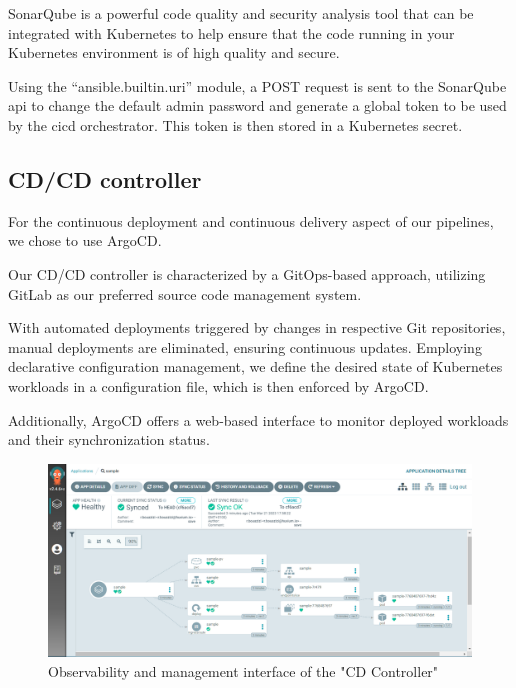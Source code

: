 \hspace{7mm}SonarQube is a powerful code quality and security analysis tool that can be integrated with Kubernetes to help ensure that the code running in your Kubernetes environment is of high quality and secure.

\hspace{7mm}Using the “ansible.builtin.uri” module, a POST request is sent to the SonarQube api to change the default admin password and generate a global token to be used by the cicd orchestrator. This token is then stored in a Kubernetes secret.

\subsection{CD/CD controller }

\hspace{7mm}For the continuous deployment and continuous delivery aspect of our pipelines, we chose to use ArgoCD. 

\hspace{7mm}Our CD/CD controller is characterized by a GitOps-based approach, utilizing GitLab as our preferred source code management system.

\hspace{7mm}With automated deployments triggered by changes in respective Git repositories, manual deployments are eliminated, ensuring continuous updates. Employing declarative configuration management, we define the desired state of Kubernetes workloads in a configuration file, which is then enforced by ArgoCD. 

\hspace{7mm}Additionally, ArgoCD offers a web-based interface to monitor deployed workloads and their synchronization status. 

\begin{figure}[H]\centering
\includegraphics[width=1.0\textwidth,angle=00]{assets/f43.png}
\caption{ Observability and management interface of the "CD Controller" }
\label{fig:AgroCD interface}
\end{figure}

